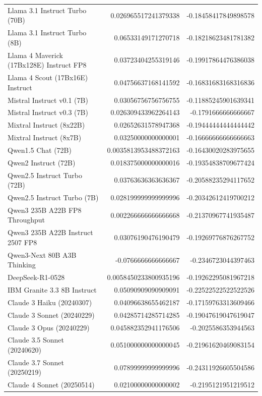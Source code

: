 \begin{table}[htp]
{\begin{tabular}{lrr}
Llama 3.1 Instruct Turbo (70B) & 0.026965517241379338 & -0.18458417849898578 \\
Llama 3.1 Instruct Turbo (8B) & 0.06533149171270718 & -0.18218623481781382 \\
Llama 4 Maverick (17Bx128E) Instruct FP8 & 0.03723404255319146 & -0.19917864476386038 \\
Llama 4 Scout (17Bx16E) Instruct & 0.04756637168141592 & -0.16831683168316836 \\
Mistral Instruct v0.1 (7B) & 0.03056756756756755 & -0.11885245901639341 \\
Mistral Instruct v0.3 (7B) & 0.026309433962264143 & -0.1791666666666667 \\
Mixtral Instruct (8x22B) & 0.02652631578947368 & -0.19444444444444442 \\
Mixtral Instruct (8x7B) & 0.03250000000000001 & -0.16666666666666663 \\
Qwen1.5 Chat (72B) & 0.0035813953488372163 & -0.16430020283975655 \\
Qwen2 Instruct (72B) & 0.018375000000000016 & -0.19354838709677424 \\
Qwen2.5 Instruct Turbo (72B) & 0.03763636363636367 & -0.20588235294117652 \\
Qwen2.5 Instruct Turbo (7B) & 0.028199999999999996 & -0.20342612419700212 \\
Qwen3 235B A22B FP8 Throughput & 0.002266666666666668 & -0.21370967741935487 \\
Qwen3 235B A22B Instruct 2507 FP8 & 0.03076190476190479 & -0.19269776876267752 \\
Qwen3-Next 80B A3B Thinking & -0.0766666666666667 & -0.2346723044397463 \\
DeepSeek-R1-0528 & 0.0058450233800935196 & -0.19262295081967218 \\
IBM Granite 3.3 8B Instruct & 0.05090909090909091 & -0.22522522522522526 \\
Claude 3 Haiku (20240307) & 0.04096638655462187 & -0.17159763313609466 \\
Claude 3 Sonnet (20240229) & 0.04285714285714285 & -0.19047619047619047 \\
Claude 3 Opus (20240229) & 0.045882352941176506 & -0.2025586353944563 \\
Claude 3.5 Sonnet (20240620) & 0.051000000000000045 & -0.21961620469083154 \\
Claude 3.7 Sonnet (20250219) & 0.07899999999999996 & -0.24311926605504586 \\
Claude 4 Sonnet (20250514) & 0.02100000000000002 & -0.2195121951219512 \\

\end{tabular}}
\end{table}
